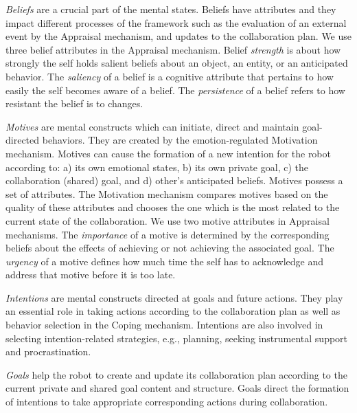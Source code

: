 \documentclass{article}
\begin{document}
\textit{Beliefs} are a crucial part of the mental states. Beliefs have
attributes and they impact different processes of the framework such as the
evaluation of an external event by the Appraisal mechanism, and updates to the
collaboration plan. We use three belief attributes in the Appraisal mechanism.
Belief \textit{strength} is about how strongly the self holds salient beliefs
about an object, an entity, or an anticipated behavior. The \textit{saliency} of
a belief is a cognitive attribute that pertains to how easily the self becomes
aware of a belief. The \textit{persistence} of a belief refers to how resistant
the belief is to changes.

\textit{Motives} are mental constructs which can initiate, direct and maintain
goal-directed behaviors. They are created by the emotion-regulated Motivation
mechanism. Motives can cause the formation of a new intention for the robot
according to: a) its own emotional states, b) its own private goal, c) the
collaboration (shared) goal, and d) other's anticipated beliefs. Motives possess
a set of attributes. The Motivation mechanism compares motives based on the
quality of these attributes and chooses the one which is the most related to the
current state of the collaboration. We use two motive attributes in Appraisal
mechanisms. The \textit{importance} of a motive is determined by the
corresponding beliefs about the effects of achieving or not achieving the
associated goal. The \textit{urgency} of a motive defines how much time the self
has to acknowledge and address that motive before it is too late.

\textit{Intentions} are mental constructs directed at goals and future actions.
They play an essential role in taking actions according to the collaboration
plan as well as behavior selection in the Coping mechanism. Intentions are
also involved in selecting intention-related strategies, e.g., planning, seeking
instrumental support and procrastination. 


\textit{Goals} help the robot to create and update its collaboration plan
according to the current private and shared goal content and structure. Goals
direct the formation of intentions to take appropriate corresponding actions
during collaboration. 
\end{document}
